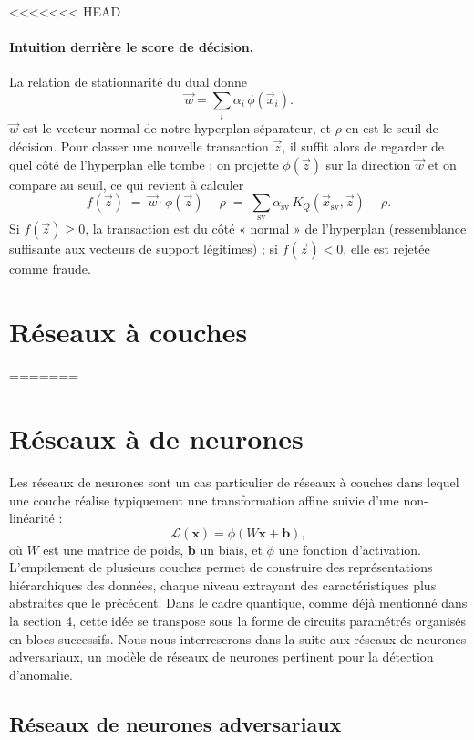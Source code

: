 \documentclass[a4paper]{article}
\begin{document}
<<<<<<< HEAD
\paragraph{Intuition derrière le score de décision.} La relation de stationnarité du dual donne
\[
\vec{w} = \sum_{i} \alpha_i\, \phi(\vec{x}_i).
\]
$\vec{w}$ est le vecteur normal de notre hyperplan séparateur, et $\rho$ en est le seuil de décision. Pour classer une nouvelle transaction $\vec{z}$, il suffit alors de regarder de quel côté de l'hyperplan elle tombe : on projette $\phi(\vec{z})$ sur la direction $\vec{w}$ et on compare au seuil, ce qui revient à calculer
\[
f(\vec{z}) \;=\; \vec{w} \cdot \phi(\vec{z}) - \rho \;=\; \sum_{\text{sv}} \alpha_{\text{sv}}\, K_Q(\vec{x}_{\text{sv}}, \vec{z}) - \rho.
\]
Si $f(\vec{z}) \geq 0$, la transaction est du côté « normal » de l'hyperplan (ressemblance suffisante aux vecteurs de support légitimes) ; si $f(\vec{z}) < 0$, elle est rejetée comme fraude.

\section{Réseaux à couches}
=======
\section{Réseaux à de neurones}

Les réseaux de neurones sont un cas particulier de réseaux à couches dans lequel une couche réalise typiquement une transformation affine suivie d’une non-linéarité :
\[
\mathcal{L}(\mathbf{x}) = \phi(W\mathbf{x} + \mathbf{b}),
\]
où $W$ est une matrice de poids, $\mathbf{b}$ un biais, et $\phi$ une fonction d’activation. L’empilement de plusieurs couches permet de construire des représentations hiérarchiques des données, chaque niveau extrayant des caractéristiques plus abstraites que le précédent.
Dans le cadre quantique, comme déjà mentionné dans la section 4, cette idée se transpose sous la forme de circuits paramétrés organisés en blocs successifs. Nous nous interreserons dans la suite aux réseaux de neurones adversariaux, un modèle de réseaux de neurones pertinent pour la détection d'anomalie.

\subsection{Réseaux de neurones adversariaux}
\end{document}
